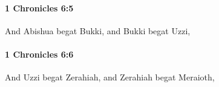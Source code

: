 		\paragraph{1 Chronicles 6:5} %
			\label{1CHRONICLES-6-5}

			And Abishua begat Bukki, and Bukki begat Uzzi,


		\paragraph{1 Chronicles 6:6} %
			\label{1CHRONICLES-6-6}

			And Uzzi begat Zerahiah, and Zerahiah begat Meraioth,


